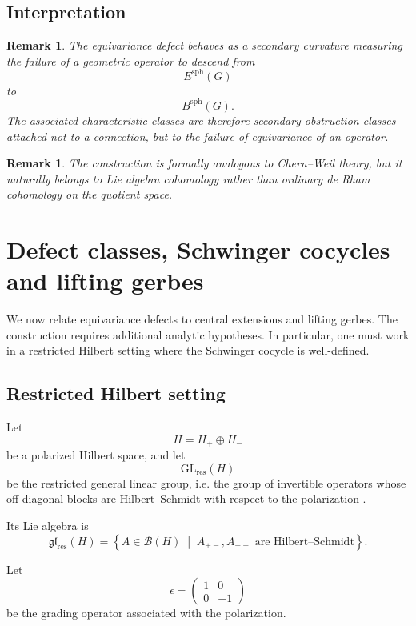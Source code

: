 \documentclass[11pt]{amsart}
\newtheorem{remark}[definition]{Remark}
\begin{document}
\subsection{Interpretation}

\begin{remark}
The equivariance defect behaves as a secondary curvature measuring the failure
of a geometric operator to descend from
\[
E^{\mathrm{sph}}(G)
\]
to
\[
B^{\mathrm{sph}}(G).
\]
The associated characteristic classes are therefore secondary obstruction
classes attached not to a connection, but to the failure of equivariance of an
operator.
\end{remark}

\begin{remark}
The construction is formally analogous to Chern--Weil theory, but it naturally
belongs to Lie algebra cohomology rather than ordinary de Rham cohomology on
the quotient space.
\end{remark}
\section{Defect classes, Schwinger cocycles and lifting gerbes}
\label{sec:defect-schwinger-gerbe}

We now relate equivariance defects to central extensions and lifting gerbes.
The construction requires additional analytic hypotheses. In particular, one
must work in a restricted Hilbert setting where the Schwinger cocycle is
well-defined.

\subsection{Restricted Hilbert setting}

Let
\[
H=H_+\oplus H_-
\]
be a polarized Hilbert space, and let
\[
\mathrm{GL}_{\mathrm{res}}(H)
\]
be the restricted general linear group, i.e. the group of invertible operators
whose off-diagonal blocks are Hilbert--Schmidt with respect to the
polarization \cite{PressleySegal1986}.

Its Lie algebra is
\[
\mathfrak{gl}_{\mathrm{res}}(H)
=
\left\{
A\in\mathcal B(H)
\;\middle|\;
A_{+-},A_{-+}\text{ are Hilbert--Schmidt}
\right\}.
\]

Let
\[
\epsilon
=
\begin{pmatrix}
1 & 0\\
0 & -1
\end{pmatrix}
\]
be the grading operator associated with the polarization.
\end{document}
